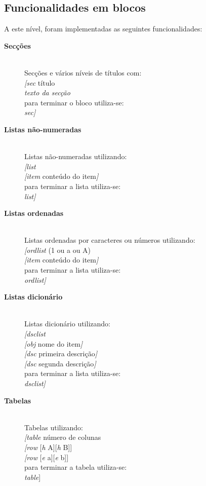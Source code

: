 \documentclass{article}
\begin{document}
 \subsection{Funcionalidades em blocos}
A este nível, foram implementadas as seguintes funcionalidades:
\begin{description}
\item[\textbf{Secções}]\\
Secções e vários níveis de títulos com:\\
\textit{[sec} título\\
\textit{texto da secção}\\
para terminar o bloco utiliza-se:\\
\textit{sec]}
\item[\textbf{Listas não-numeradas}]\\
Listas não-numeradas utilizando:\\
\textit{[list}\\
\textit{[item} conteúdo do item\textit{]}\\
para terminar a lista utiliza-se:\\
\textit{list]}
\item[\textbf{Listas ordenadas}]\\
Listas ordenadas por caracteres ou números utilizando:\\
\textit{[ordlist} (1 ou a ou A)\\
\textit{[item} conteúdo do item\textit{]}\\
para terminar a lista utiliza-se:\\
\textit{ordlist]}
\item[\textbf{Listas dicionário}]\\
Listas dicionário utilizando:\\
\textit{[dsclist}\\
\textit{[obj} nome do item\textit{]}\\
\textit{[dsc} primeira descrição\textit{]}\\
\textit{[dsc} segunda descrição\textit{]}\\
para terminar a lista utiliza-se:\\
\textit{dsclist\textit{]}}
\item[\textbf{Tabelas}]\\
Tabelas utilizando:\\
\textit{[table} número de colunas\\
\textit{[row} [\textit{h} A][\textit{h} B]]\\
\textit{[row} [\textit{e} a][\textit{e} b]]\\
para terminar a tabela utiliza-se:\\
\textit{table}]
\end{description}
\end{document}
